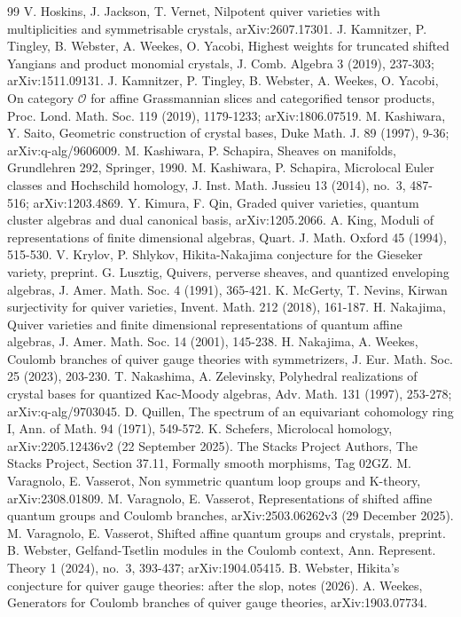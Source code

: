 \documentclass[11pt,reqno]{amsart}
\theoremstyle{definition}
\theoremstyle{remark}
\begin{document}
\begin{thebibliography}{99}
 V. Hoskins, J. Jackson, T. Vernet, Nilpotent quiver varieties with multiplicities and symmetrisable crystals, arXiv:2607.17301.
 J. Kamnitzer, P. Tingley, B. Webster, A. Weekes, O. Yacobi, Highest weights for truncated shifted Yangians and product monomial
crystals, J. Comb. Algebra 3 (2019), 237-303; arXiv:1511.09131.
 J. Kamnitzer, P. Tingley, B. Webster, A. Weekes, O. Yacobi, On category $\mathcal O$ for affine Grassmannian slices and categorified tensor
products, Proc. Lond. Math. Soc. 119 (2019), 1179-1233; arXiv:1806.07519.
 M. Kashiwara, Y. Saito, Geometric construction of crystal bases, Duke Math. J. 89 (1997), 9-36; arXiv:q-alg/9606009.
 M. Kashiwara, P. Schapira, Sheaves on manifolds, Grundlehren 292, Springer, 1990.
 M. Kashiwara, P. Schapira, Microlocal Euler classes and Hochschild homology,
J. Inst. Math. Jussieu 13 (2014), no.~3, 487-516; arXiv:1203.4869.
 Y. Kimura, F. Qin, Graded quiver varieties, quantum cluster algebras and dual canonical basis, arXiv:1205.2066.
 A. King, Moduli of representations of finite dimensional algebras, Quart. J. Math. Oxford 45 (1994), 515-530.
 V. Krylov, P. Shlykov, Hikita-Nakajima conjecture for the Gieseker variety, preprint.
 G. Lusztig, Quivers, perverse sheaves, and quantized enveloping algebras,
J. Amer. Math. Soc. 4 (1991), 365-421.
 K. McGerty, T. Nevins, Kirwan surjectivity for quiver varieties, Invent. Math. 212 (2018), 161-187.
 H. Nakajima, Quiver varieties and finite dimensional representations of quantum affine algebras, J. Amer. Math. Soc. 14
(2001), 145-238.
 H. Nakajima, A. Weekes, Coulomb branches of quiver gauge theories with symmetrizers, J. Eur. Math. Soc. 25 (2023), 203-230.
 T. Nakashima, A. Zelevinsky, Polyhedral realizations of crystal bases for quantized Kac-Moody algebras, Adv. Math. 131 (1997), 253-278; arXiv:q-alg/9703045.
 D. Quillen, The spectrum of an equivariant cohomology ring I, Ann. of Math. 94 (1971), 549-572.
 K. Schefers, Microlocal homology, arXiv:2205.12436v2 (22 September 2025).
 The Stacks Project Authors, The Stacks Project, Section 37.11, Formally smooth morphisms, Tag 02GZ.
 M. Varagnolo, E. Vasserot, Non symmetric quantum loop groups and K-theory, arXiv:2308.01809.
 M. Varagnolo, E. Vasserot, Representations of shifted affine quantum groups and Coulomb branches, arXiv:2503.06262v3 (29 December 2025).
 M. Varagnolo, E. Vasserot, Shifted affine quantum groups and crystals, preprint.
 B. Webster, Gelfand-Tsetlin modules in the Coulomb context, Ann. Represent. Theory 1 (2024), no.~3, 393-437; arXiv:1904.05415.
 B. Webster, Hikita's conjecture for quiver gauge theories: after the slop, notes (2026).
 A. Weekes, Generators for Coulomb branches of quiver gauge theories, arXiv:1903.07734.
\end{thebibliography}
\end{document}
